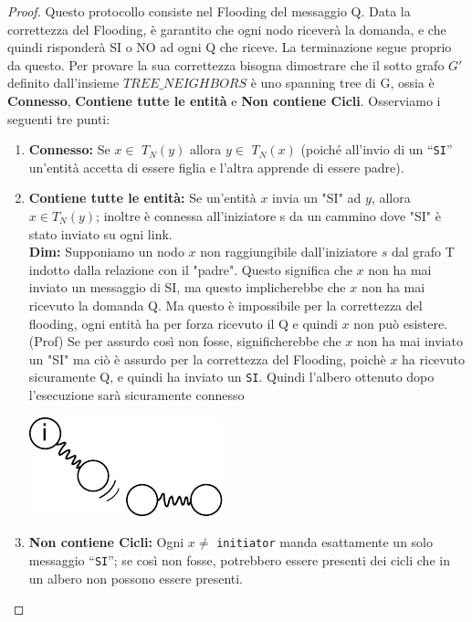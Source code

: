 \begin{proof}
    Questo protocollo consiste nel Flooding del messaggio Q. Data la correttezza
    del Flooding, è garantito che ogni nodo riceverà la domanda, e che quindi
    risponderà SI o NO ad ogni Q che riceve. La terminazione segue proprio da
    questo. Per provare la sua correttezza bisogna dimostrare che il sotto grafo
    $G'$ definito dall'insieme $TREE\_NEIGHBORS$ è uno spanning tree di G, ossia
    è \textbf{Connesso}, \textbf{Contiene tutte le entità} e \textbf{Non
        contiene Cicli}. Osserviamo i seguenti tre punti:
    \begin{enumerate}
        \item \textbf{Connesso:} Se $x \in$ $T_N(y)$ allora $y \in$ $T_N(x)$
              (poiché all'invio di un ``\texttt{SI}'' un'entità accetta di
              essere figlia e l'altra apprende di essere padre).
        \item \textbf{Contiene tutte le entità:} Se un'entità $x$ invia un "SI"
              ad $y$, allora $x \in T_N(y)$; inoltre è connessa all'iniziatore s
              da un cammino dove "SI" è stato inviato su ogni link. \\
              \textbf{Dim:} Supponiamo un nodo $x$ non raggiungibile
              dall'iniziatore $s$ dal grafo T indotto dalla relazione con il
              "padre". Questo significa che $x$ non ha mai inviato un messaggio
              di SI, ma questo implicherebbe che $x$ non ha mai ricevuto la
              domanda Q. Ma questo è impossibile per la correttezza del
              flooding, ogni entità ha per forza ricevuto il Q e quindi $x$ non
              può esistere.\\
              (Prof) Se per assurdo così non fosse, significherebbe che $x$ non
              ha mai inviato un "SI" ma ciò è assurdo per la correttezza del
              Flooding, poichè $x$ ha ricevuto sicuramente Q, e quindi ha
              inviato un \texttt{SI}. Quindi l'albero ottenuto dopo l'esecuzione
              sarà sicuramente connesso
              \begin{center}
                  \includegraphics[scale=1]{images/n_21}
              \end{center}
        \item \textbf{Non contiene Cicli:} Ogni $x \neq $ \texttt{initiator}
              manda esattamente un solo messaggio ``\texttt{SI}''; se così non
              fosse, potrebbero essere presenti dei cicli che in un albero non
              possono essere presenti.
    \end{enumerate}
\end{proof}


